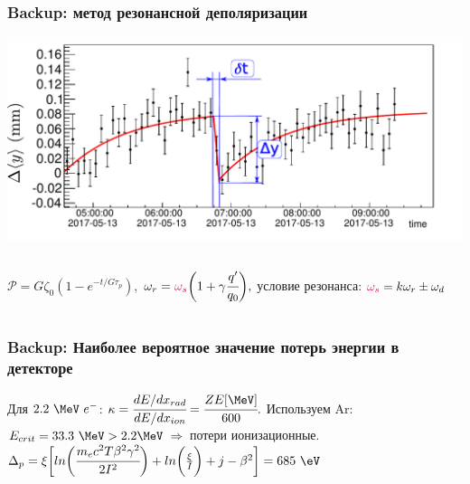\documentclass[14pt]{beamer}
\begin{document}
\begin{frame}[t]
\frametitle{Backup: метод резонансной деполяризации}
\centering \includegraphics[width=0.8\linewidth]{rd_exp.pdf}
\vspace{15pt}
\begin{columns}
		\small
				$\mathcal{P} = G\zeta_0(1-e^{-t/G\tau_p}),$			
		$\omega_r = \color{calmRed}{\omega_s} \color{black}\biggl(1+ \gamma \cfrac{q'}{q_0}\biggr),$	
		условие резонанса: $\color{calmRed}{\omega_s}\color{black}  = k \omega_r \pm \omega_d$
\end{columns}
\end{frame}

\begin{frame}[t]
\frametitle{Backup: Наиболее вероятное значение потерь энергии в детекторе}
Для $2.2~\MeV~e^{-}$:
\newline
\newline $\kappa = \cfrac{dE/dx_{rad}}{dE/dx_{ion}}= \cfrac{ Z E[\MeV] }{600}.$
\newline 
\newline Используем Ar: $E_{crit} = 33.3~\MeV > 2.2 \MeV~\Rightarrow$ потери ионизационные.
\newline
\newline $\Delta_p = \xi\biggl[ln \bigg(\cfrac{ m_ec^2T\beta^2\gamma^2}{2I^2}\bigg) + ln\bigg(\frac{\xi}{I}\bigg) + j - \beta^2 \biggr] = 685~\eV$

\end{frame}
\end{document}
